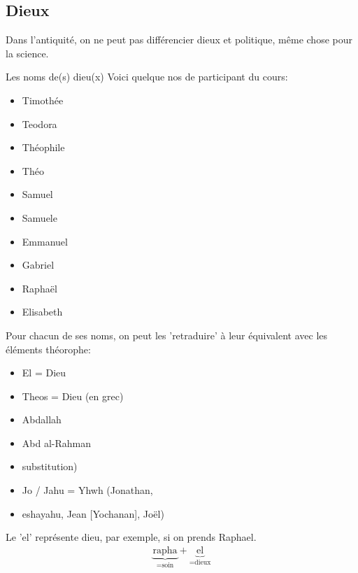 \subsection{Dieux}
Dans l'antiquité, on ne peut pas différencier dieux et politique, même chose pour la science.
\begin{parag}{Les noms de(s) dieu(x)}
    Voici quelque nos de participant du cours:
	\begin{itemize}
		\item Timothée
		\item  Teodora
		\item  Théophile
		\item  Théo
		\item  Samuel
		\item  Samuele
		\item  Emmanuel
		\item  Gabriel
		\item  Raphaël
		\item  Elisabeth 
	\end{itemize}
	Pour chacun de ses noms, on peut les 'retraduire' à leur équivalent avec les éléments théorophe:
	\begin{itemize}
		\item  El = Dieu
		\item  Theos = Dieu (en grec)
		\item  Abdallah
		\item  Abd al-Rahman
		\item substitution)
		\item  Jo / Jahu = Yhwh (Jonathan,
		\item eshayahu, Jean [Yochanan],
Joël) 
	\end{itemize}
	Le 'el' représente dieu, par exemple, si on prends Raphael.
	\begin{align*} \underbrace{\text{rapha}}_{= \text{soin}} + \underbrace{\text{el}}_{= \text{dieux}} \end{align*}
	
\end{parag}
